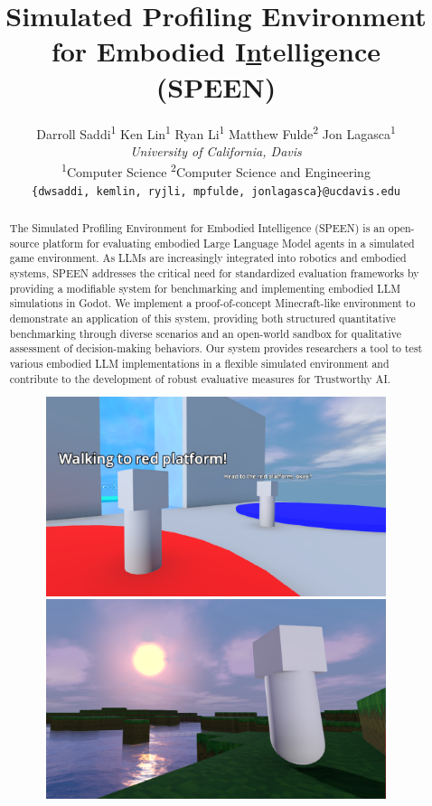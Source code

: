 \documentclass{article}
\title{Simulated Profiling Environment for Embodied I\underline{n}telligence (SPEEN)}
\author{%
    Darroll Saddi\textsuperscript{1} \quad
        Ken Lin\textsuperscript{1} \quad
        Ryan Li\textsuperscript{1} \quad
        Matthew Fulde\textsuperscript{2} \quad
        Jon Lagasca\textsuperscript{1} \vspace{0.75em} \\
        \large{\textit{University of California, Davis}} \\
        \vspace{0.5em}
        \textsuperscript{1}Computer Science \quad
        \textsuperscript{2}Computer Science and Engineering \\
        \texttt{\{dwsaddi, kemlin, ryjli, mpfulde, jonlagasca\}@ucdavis.edu}
    }
\begin{document}
\maketitle

\begin{abstract}
    The Simulated Profiling Environment for Embodied Intelligence (SPEEN) is an open-source platform for evaluating embodied Large Language Model agents in a simulated game environment.
    As LLMs are increasingly integrated into robotics and embodied systems, SPEEN addresses the critical need for standardized evaluation frameworks by providing a modifiable system for benchmarking and implementing embodied LLM simulations in Godot.
    We implement a proof-of-concept Minecraft-like environment to demonstrate an application of this system, providing both structured quantitative benchmarking through diverse scenarios and an open-world sandbox for qualitative assessment of decision-making behaviors.
    Our system provides researchers a tool to test various embodied LLM implementations in a flexible simulated environment and contribute to the development of robust evaluative measures for Trustworthy AI.
    \begin{figure}[ht!]
        \centering
        \begin{minipage}[b]{0.47\textwidth}
            \centering
            \includegraphics[width=\textwidth]{./example.png}
        \end{minipage}
        \hfill
        \begin{minipage}[b]{0.47\textwidth}
            \centering
            \includegraphics[width=\textwidth]{./example2.png}

\end{minipage}
\end{figure}
\end{abstract}
\end{document}
